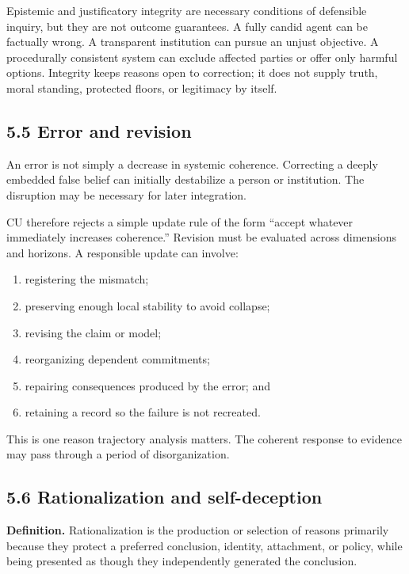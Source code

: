 \documentclass[
  11pt,
]{article}
\providecommand{\tightlist}{%
  \setlength{\itemsep}{0pt}\setlength{\parskip}{0pt}}
\begin{document}
Epistemic and justificatory integrity are necessary conditions of
defensible inquiry, but they are not outcome guarantees. A fully candid
agent can be factually wrong. A transparent institution can pursue an
unjust objective. A procedurally consistent system can exclude affected
parties or offer only harmful options. Integrity keeps reasons open to
correction; it does not supply truth, moral standing, protected floors,
or legitimacy by itself.

\subsection{5.5 Error and revision}\label{error-and-revision}

An error is not simply a decrease in systemic coherence. Correcting a
deeply embedded false belief can initially destabilize a person or
institution. The disruption may be necessary for later integration.

CU therefore rejects a simple update rule of the form ``accept whatever
immediately increases coherence.'' Revision must be evaluated across
dimensions and horizons. A responsible update can involve:

\begin{enumerate}
\def\labelenumi{\arabic{enumi}.}
\tightlist
\item
  registering the mismatch;
\item
  preserving enough local stability to avoid collapse;
\item
  revising the claim or model;
\item
  reorganizing dependent commitments;
\item
  repairing consequences produced by the error; and
\item
  retaining a record so the failure is not recreated.
\end{enumerate}

This is one reason trajectory analysis matters. The coherent response to
evidence may pass through a period of disorganization.

\subsection{5.6 Rationalization and
self-deception}\label{rationalization-and-self-deception}

\textbf{Definition.} Rationalization is the production or selection of
reasons primarily because they protect a preferred conclusion, identity,
attachment, or policy, while being presented as though they
independently generated the conclusion.
\end{document}
